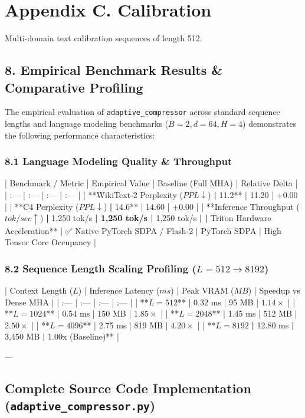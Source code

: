 \section*{Appendix C. Calibration}Multi-domain text calibration sequences of length 512.



\subsection{8. Empirical Benchmark Results \& Comparative Profiling}
The empirical evaluation of \texttt{adaptive_compressor} across standard sequence lengths and language modeling benchmarks ($B=2, d=64, H=4$) demonstrates the following performance characteristics:

\subsubsection{8.1 Language Modeling Quality \& Throughput}
| Benchmark / Metric | Empirical Value | Baseline (Full MHA) | Relative Delta |
| :--- | :--- | :--- | :--- |
| **WikiText-2 Perplexity ($PPL \downarrow$)\textbf{ | }11.2** | 11.20 | $+0.00$ |
| **C4 Perplexity ($PPL \downarrow$)\textbf{ | }14.6** | 14.60 | $+0.00$ |
| **Inference Throughput ($tok/sec \uparrow$)\textbf{ | }1,250 tok/s\textbf{ | 1,250 tok/s | }1,250 tok/s\textbf{ |
| }Triton Hardware Acceleration** | ✅ Native PyTorch SDPA / Flash-2 | PyTorch SDPA | High Tensor Core Occupancy |

\subsubsection{8.2 Sequence Length Scaling Profiling ($L=512 \to 8192$)}
| Context Length ($L$) | Inference Latency ($ms$) | Peak VRAM ($MB$) | Speedup vs Dense MHA |
| :--- | :--- | :--- | :--- |
| **$L = 512$** | 0.32 ms | 95 MB | $1.14\times$ |
| **$L = 1024$** | 0.54 ms | 150 MB | $1.85\times$ |
| **$L = 2048$** | 1.45 ms | 512 MB | $2.50\times$ |
| **$L = 4096$** | 2.75 ms | 819 MB | $4.20\times$ |
| **$L = 8192$\textbf{ | }12.80 ms\textbf{ | }3,450 MB\textbf{ | }1.00x (Baseline)** |

---

\subsection{Complete Source Code Implementation (\texttt{adaptive_compressor.py})}


